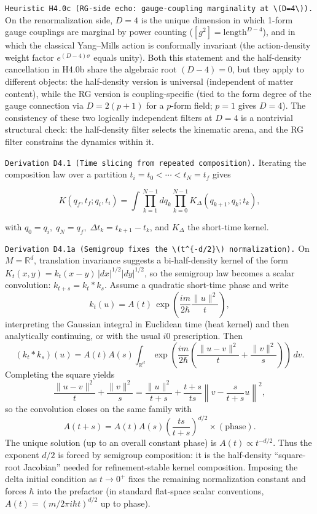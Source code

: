 \documentclass[
]{article}
\begin{document}
\texttt{Heuristic\ H4.0c\ (RG-side\ echo:\ gauge-coupling\ marginality\ at\ \textbackslash{}(D=4\textbackslash{})).}
On the renormalization side, \(D=4\) is the unique dimension in which
1-form gauge couplings are marginal by power counting
(\([g^2]=\text{length}^{D-4}\)), and in which the classical Yang--Mills
action is conformally invariant (the action-density weight factor
\(e^{(D-4)\sigma}\) equals unity). Both this statement and the
half-density cancellation in H4.0b share the algebraic root \((D-4)=0\),
but they apply to different objects: the half-density version is
universal (independent of matter content), while the RG version is
coupling-specific (tied to the form degree of the gauge connection via
\(D=2(p+1)\) for a \(p\)-form field; \(p=1\) gives \(D=4\)). The
consistency of these two logically independent filters at \(D=4\) is a
nontrivial structural check: the half-density filter selects the
kinematic arena, and the RG filter constrains the dynamics within it.

\texttt{Derivation\ D4.1\ (Time\ slicing\ from\ repeated\ composition).}
Iterating the composition law over a partition
\(t_i=t_0<\cdots<t_N=t_f\) gives

\[
K(q_f,t_f;q_i,t_i)=
\int \prod_{k=1}^{N-1} dq_k
\prod_{k=0}^{N-1}
K_\Delta(q_{k+1},q_k;t_k),
\]

with \(q_0=q_i,\;q_N=q_f,\;\Delta t_k=t_{k+1}-t_k\), and \(K_\Delta\)
the short-time kernel.

\texttt{Derivation\ D4.1a\ (Semigroup\ fixes\ the\ \textbackslash{}(t\^{}\{-d/2\}\textbackslash{})\ normalization).}
On \(M=\mathbb R^d\), translation invariance suggests a bi-half-density
kernel of the form \(K_t(x,y)=k_t(x-y)\,|dx|^{1/2}|dy|^{1/2}\), so the
semigroup law becomes a scalar convolution: \(k_{t+s}=k_t*k_s\). Assume
a quadratic short-time phase and write \[
k_t(u)=A(t)\,\exp\!\left(\frac{i m}{2\hbar}\frac{\|u\|^2}{t}\right),
\] interpreting the Gaussian integral in Euclidean time (heat kernel)
and then analytically continuing, or with the usual \(i0\) prescription.
Then \[
(k_t*k_s)(u)=A(t)A(s)\int_{\mathbb R^d}
\exp\!\left(\frac{i m}{2\hbar}\left(\frac{\|u-v\|^2}{t}+\frac{\|v\|^2}{s}\right)\right)\,dv.
\] Completing the square yields \[
\frac{\|u-v\|^2}{t}+\frac{\|v\|^2}{s}
=\frac{\|u\|^2}{t+s}+\frac{t+s}{ts}\left\|v-\frac{s}{t+s}u\right\|^2,
\] so the convolution closes on the same family with \[
A(t+s)=A(t)A(s)\left(\frac{ts}{t+s}\right)^{d/2}\times(\text{phase}).
\] The unique solution (up to an overall constant phase) is
\(A(t)\propto t^{-d/2}\). Thus the exponent \(d/2\) is forced by
semigroup composition: it is the half-density ``square-root Jacobian''
needed for refinement-stable kernel composition. Imposing the delta
initial condition as \(t\to0^+\) fixes the remaining normalization
constant and forces \(\hbar\) into the prefactor (in standard flat-space
scalar conventions, \(A(t)=(m/2\pi i\hbar t)^{d/2}\) up to phase).
\end{document}
